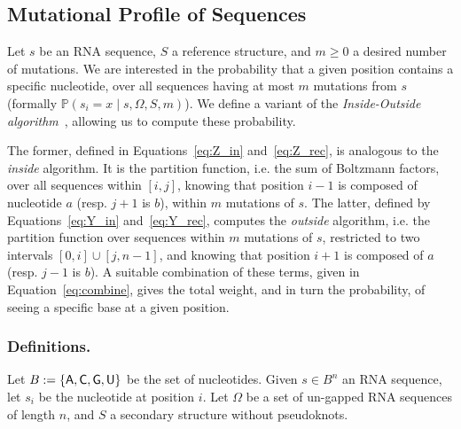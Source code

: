 \subsection{Mutational Profile of Sequences}


Let $s$ be an RNA sequence, $S$ a reference structure, and $m\geq 0$ a desired number of mutations. 
We are interested in  the probability that a given position contains a specific nucleotide, over all sequences having at most $m$ mutations from $s$
(formally $\mathbb{P}(s_i = x\mid s,\Omega, S,m)$). 
We define a variant of the
 \emph{Inside-Outside algorithm}~\cite{Lari1990}, allowing us to compute these
 probability. 

The former, defined in Equations~\eqref{eq:Z_in} and~\eqref{eq:Z_rec}, is analogous to the \emph{inside} algorithm.
It is the partition function, i.e. the sum of Boltzmann factors, over all sequences within $[i,j]$, 
knowing that position $i-1$ is composed of nucleotide $a$ (resp. $j+1$ is $b$), within 
$m$ mutations of $s$. The latter, defined by Equations~\eqref{eq:Y_in} and~\eqref{eq:Y_rec},
 computes the \emph{outside} algorithm, i.e.  
the partition function over sequences within $m$ mutations of $s$, restricted to two intervals $[0,i]\cup[j,n-1]$, and 
knowing  that position $i+1$ is composed of $a$ (resp. $j-1$ is $b$). A suitable combination of these terms, given in Equation~\eqref{eq:combine}, gives the total weight, and in turn the probability, of seeing a specific base at a given position.






\subsubsection{Definitions.}
Let $B:=\left\{{\sf{A}},{\sf{C}},{\sf{G}},{\sf{U}}\right\}$ be the set of nucleotides.
Given $s\in B^n$ an RNA sequence, let $s_i$ be the nucleotide at position $i$. Let $\Omega$ be a set of un-gapped RNA sequences of
length $n$, and $S$ a secondary structure without pseudoknots. 

